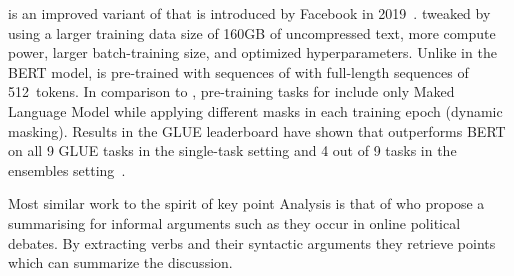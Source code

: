 \Roberta is an improved variant of \Bert that is introduced by Facebook in 2019~\cite{LiuOGDJCLLZS2019}. \citet{LiuOGDJCLLZS2019} tweaked \Bert by using a larger training data size of 160GB of uncompressed text, more compute power, larger batch-training size, and optimized hyperparameters. Unlike in the BERT model, \Roberta is pre-trained with sequences of with full-length sequences of 512~tokens. In comparison to \Bert, pre-training tasks for \Roberta include only Maked Language Model while applying different masks in each training epoch (dynamic masking). Results in the GLUE leaderboard have shown that \Roberta outperforms BERT on all 9 GLUE tasks in the single-task setting and 4 out of 9 tasks in the ensembles setting~\cite{WangSMHLB2018,LiuOGDJCLLZS2019}.

Most similar work to the spirit of key point Analysis is that of \citet{egan2016summarising} who propose a summarising for informal arguments such as they occur in online political debates. By extracting verbs and their syntactic arguments they retrieve points which can summarize the discussion.





